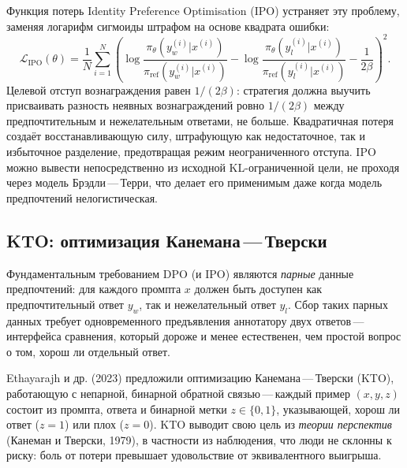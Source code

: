 Функция потерь Identity Preference Optimisation (IPO) устраняет эту проблему, заменяя логарифм сигмоиды штрафом на основе квадрата ошибки:
\begin{equation}
\label{eq:ipo-loss}
\mathcal{L}_\mathrm{IPO}(\theta)
= \frac{1}{N}\sum_{i=1}^{N}
\left(
\log\frac{\pi_\theta(y_w^{(i)}|x^{(i)})}{\pi_\mathrm{ref}(y_w^{(i)}|x^{(i)})}
- \log\frac{\pi_\theta(y_l^{(i)}|x^{(i)})}{\pi_\mathrm{ref}(y_l^{(i)}|x^{(i)})}
- \frac{1}{2\beta}
\right)^2.
\end{equation}
Целевой отступ вознаграждения равен $1/(2\beta)$: стратегия должна выучить присваивать разность неявных вознаграждений ровно $1/(2\beta)$ между предпочтительным и нежелательным ответами, не больше. Квадратичная потеря создаёт восстанавливающую силу, штрафующую как недостаточное, так и избыточное разделение, предотвращая режим неограниченного отступа. IPO можно вывести непосредственно из исходной KL-ограниченной цели, не проходя через модель Брэдли\,---\,Терри, что делает его применимым даже когда модель предпочтений нелогистическая.

\subsection{KTO: оптимизация Канемана\,---\,Тверски}

Фундаментальным требованием DPO (и IPO) являются \emph{парные} данные предпочтений: для каждого промпта $x$ должен быть доступен как предпочтительный ответ $y_w$, так и нежелательный ответ $y_l$. Сбор таких парных данных требует одновременного предъявления аннотатору двух ответов\,---\,интерфейса сравнения, который дороже и менее естественен, чем простой вопрос о том, хорош ли отдельный ответ.

Ethayarajh и др. (2023) предложили оптимизацию Канемана\,---\,Тверски (KTO), работающую с непарной, бинарной обратной связью\,---\,каждый пример $(x, y, z)$ состоит из промпта, ответа и бинарной метки $z \in \{0, 1\}$, указывающей, хорош ли ответ ($z=1$) или плох ($z=0$). KTO выводит свою цель из \emph{теории перспектив} (Канеман и Тверски, 1979), в частности из наблюдения, что люди не склонны к риску: боль от потери превышает удовольствие от эквивалентного выигрыша.

